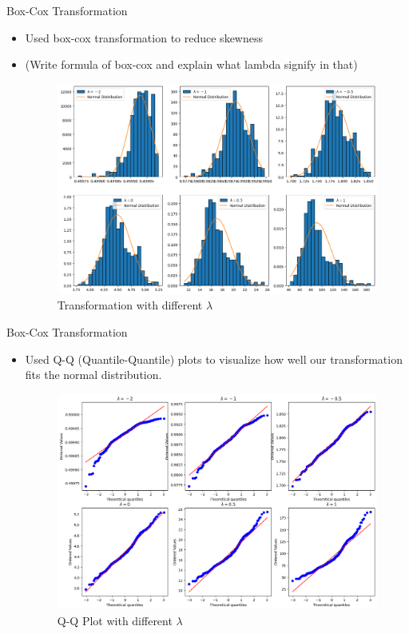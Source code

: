 \begin{frame}{Box-Cox Transformation}
\begin{itemize}
    \item Used box-cox transformation to reduce skewness
    \item (Write formula of box-cox and explain what lambda signify in that)
    \begin{figure}
        \centering
        \includegraphics[width=0.5\linewidth]{Project1/Report/images/transforms.png}
        \caption{Transformation with different $\lambda$}
        \label{fig:enter-label}
    \end{figure}
\end{itemize}
  
\end{frame}
\begin{frame}{Box-Cox Transformation}
\begin{itemize}
    \item Used Q-Q (Quantile-Quantile) plots to visualize how well our transformation fits the normal distribution.
    \vspace{0.25in}
    \begin{figure}
        \centering
        \includegraphics[width=0.5\linewidth]{Project1/Report/images/q-q.png}
        \caption{Q-Q Plot with different $\lambda$}
        \label{fig:enter-label}
    \end{figure}
\end{itemize}

\end{frame}

